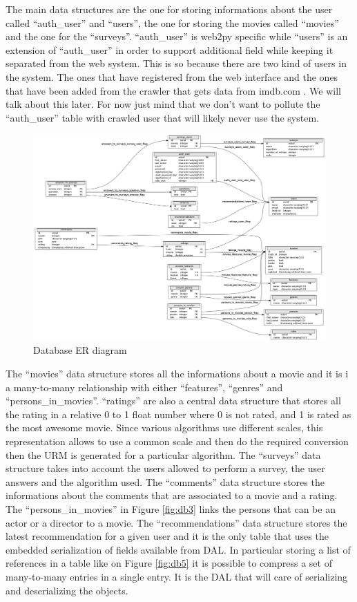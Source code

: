 The main data structures are the one for storing informations about the user called ``auth\_user'' and ``users'', the one for storing the movies called ``movies'' and the one for the ``surveys''. ``auth\_user'' is web2py specific while ``users'' is an extension of ``auth\_user'' in order to support additional field while keeping it separated from the web system. This is so because there are two kind of users in the system. The ones that have registered from the web interface and the ones that have been added from the crawler that gets data from imdb.com \cite{imdb}. We will talk about this later. For now just mind that we don't want to pollute the ``auth\_user'' table with crawled user that will likely never use the system.

\begin{figure}
  \centering
  \includegraphics[height=0.7\textheight, angle=90]{figures/db_er.png}
  \caption{Database ER diagram}
  \label{fig:db_er}
\end{figure}

The ``movies'' data structure stores all the informations about a movie and it is i a many-to-many relationship with either ``features'', ``genres'' and ``persons\_in\_movies''. ``ratings'' are also a central data structure that stores all the rating in a relative 0 to 1 float number where 0 is not rated, and 1 is rated as the most awesome movie. Since various algorithms use different scales, this representation allows to use a common scale and then do the required conversion then the \ac{URM} is generated for a particular algorithm.
The ``surveys'' data structure takes into account the users allowed to perform a survey, the user answers and the algorithm used. The ``comments'' data structure stores the informations about the comments that are associated to a movie and a rating. The ``persons\_in\_movies'' in Figure \ref{fig:db3} links the persons that can be an actor or a director to a movie. The ``recommendations'' data structure stores the latest recommendation for a given user and it is the only table that uses the embedded serialization of fields available from \ac{DAL}. In particular storing a list of references in a table like on Figure \ref{fig:db5} it is possible to compress a set of many-to-many entries in a single entry. It is the \ac{DAL} that will care of serializing and deserializing the objects.    

